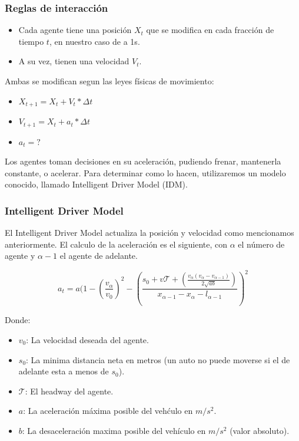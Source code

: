 \documentclass[10pt, compress]{beamer}
\begin{document}
\begin{frame}[fragile]

\frametitle{Reglas de interacci\'on}
\begin{itemize}
\item Cada agente tiene una posici\'on $X_t$ que se modifica en cada fracci\'on de tiempo $t$, en nuestro caso de a 1s.
\item A su vez, tienen una velocidad $V_t$.
\end{itemize}
Ambas se modifican segun las leyes f\'isicas de movimiento:
\begin{itemize}
\item $X_{t+1} = X_t + V_t * \Delta t$
\item $V_{t+1} = X_t + a_t * \Delta t$
\item $a_t = ?$ 
\end{itemize}

Los agentes toman decisiones en su aceleraci\'on, pudiendo frenar, mantenerla constante, o acelerar. Para determinar como lo hacen, utilizaremos un modelo conocido, llamado Intelligent Driver Model (IDM). \supercite{1}

\end{frame}

\begin{frame}[fragile]

\frametitle{Intelligent Driver Model}
El Intelligent Driver Model actualiza la posici\'on y velocidad como mencionamos anteriormente. El calculo de la aceleraci\'on es el siguiente, con $\alpha$ el n\'umero de agente y $\alpha - 1$ el agente de adelante.

  \begin{equation*}
    a_t = a (1 - (\frac{v_\alpha}{v_0})^2 - (\frac{s_0 + v\mathcal{T} + (\frac{v_\alpha (v_\alpha - v_{\alpha-1})}{2\sqrt{ab}})}{x_{\alpha-1} - x_\alpha - l_{\alpha-1}})^2
  \end{equation*}

Donde:
\begin{itemize}
\item $v_0$: La velocidad deseada del agente.
\item $s_0$: La minima distancia neta en metros (un auto no puede moverse si el de adelante esta a menos de $s_0$).
\item $\mathcal{T}$: El headway del agente.
\item $a$: La aceleraci\'on m\'axima posible del veh\'culo en $m/s^2$.
\item $b$: La desaceleraci\'on maxima posible del veh\'iculo en $m/s^2$ (valor absoluto).
\end{itemize}

\end{frame}
\end{document}
